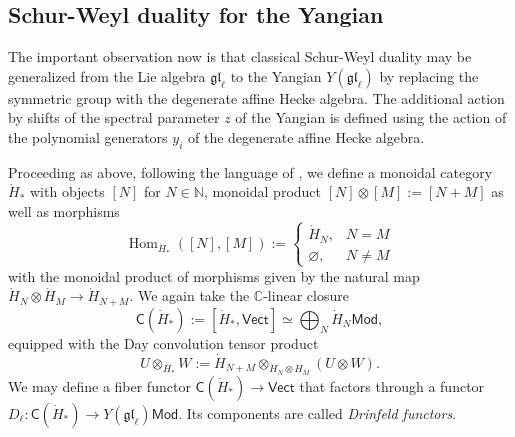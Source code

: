 \documentclass[11pt]{report}
\theoremstyle{definition}
\theoremstyle{remark}
\theoremstyle{remark}
\newcommand{\Hom}{\operatorname{Hom}}
\newcommand{\N}{\mathbb{N}}
\newcommand{\C}{\mathbb{C}}
\begin{document}
\subsection{Schur-Weyl duality for the Yangian}

The important observation now is that classical Schur-Weyl duality may be generalized from the Lie algebra $\mathfrak{gl}_\ell$ to the Yangian $Y(\mathfrak{gl}_\ell)$ by replacing the symmetric group with the degenerate affine Hecke algebra. The additional action by shifts of the spectral parameter $z$ of the Yangian is defined using the action of the polynomial generators $y_i$ of the degenerate affine Hecke algebra.

Proceeding as above, following the language of \cite{article:davydov:2010}, we define a monoidal category $\dot H_*$ with objects $[N]$ for $N \in \N$, monoidal product $[N] \otimes [M] := [N+M]$ as well as morphisms
\begin{equation*}
\Hom_{\dot H_*}([N],[M]) :=
\begin{cases}
\dot H_N, & N = M \\
\varnothing, & N \neq M
\end{cases}
\end{equation*}
with the monoidal product of morphisms given by the natural map $\dot H_N \otimes \dot H_M \to \dot H_{N+M}$. We again take the $\C$-linear closure
\begin{equation*}
\mathsf{C}(\dot H_*) := [\dot H_*,\mathsf{Vect}] \simeq \bigoplus_N \dot H_N\mathsf{Mod},
\end{equation*}
equipped with the Day convolution tensor product
\begin{equation*}
U \otimes_{\dot H_*} W := \dot H_{N+M} \otimes_{\dot H_N \otimes \dot H_M} (U \otimes W).
\end{equation*}
We may define a fiber functor $\mathsf{C}(\dot H_*) \to \mathsf{Vect}$ that factors through a functor $D_\ell: \mathsf{C}(\dot H_*) \to Y(\mathfrak{gl}_\ell)\mathsf{Mod}$. Its components are called \emph{Drinfeld functors}.
\end{document}
